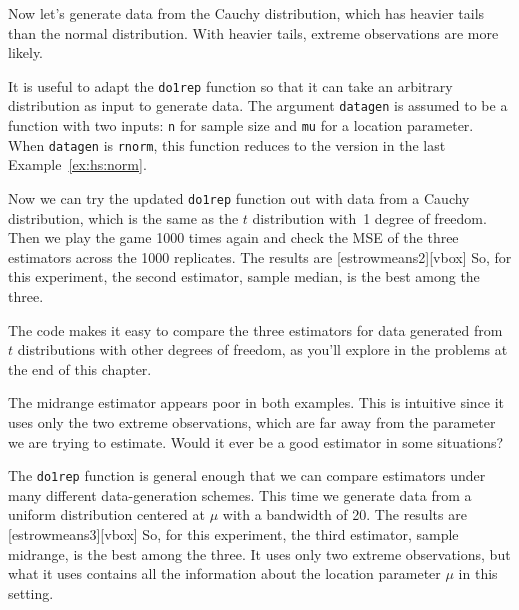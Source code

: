 \begin{example}
\label{ex:hs:cauchy}
Now let's generate data from the Cauchy distribution, which has heavier
tails than the normal distribution. With heavier tails, extreme
observations are more likely.


It is useful to adapt the \lstinline{do1rep} function so that it can take an
arbitrary distribution as input to generate data.
The argument \lstinline{datagen} is assumed to be a function with two inputs:
\lstinline{n} for sample size and \lstinline{mu} for a location parameter. When
\lstinline{datagen} is \lstinline{rnorm}, this function reduces to the version
in the last Example~\ref{ex:hs:norm}.


Now we can try the updated \lstinline{do1rep} function out with data from a
Cauchy distribution, which is the same as the $t$ distribution with~1 degree of
freedom.
Then we play the game 1000 times again and check the MSE of the three
estimators across the 1000 replicates.
The results are
[estrowmeans2][vbox]
So, for this experiment, the second estimator, sample median, is the best among
the three.

The code makes it easy to compare the three estimators for data
generated from $t$ distributions with other degrees of freedom, as
you'll explore in the problems at the end of this chapter.
\end{example}


The midrange estimator appears poor in both examples. This is intuitive since it
uses only the two extreme observations, which are far away from the parameter we
are trying to estimate. Would it ever be a good estimator in some situations?

\begin{example}
The \lstinline{do1rep} function is general enough that we can compare
estimators under many different data-generation schemes. This time we
generate data from a uniform distribution centered at $\mu$ with a
bandwidth of 20.
The results are
[estrowmeans3][vbox]
So, for this experiment, the third estimator, sample midrange, is the best among
the three. It uses only two extreme observations, but what it uses contains
all the information about the location parameter $\mu$ in this setting.
\end{example}


